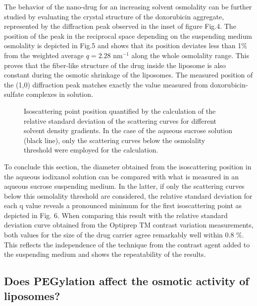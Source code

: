 The behavior of the nano-drug for an increasing solvent osmolality can be further studied by evaluating the crystal structure of the doxorubicin aggregate, represented by the diffraction peak observed in the inset of figure Fig.4. The position of the peak in the reciprocal space depending on the suspending medium osmolality is depicted in Fig.5 and shows that its position deviates less than 1$\%$ from the weighted average $q=2.28$ nm$^{-1}$ along the whole osmolality range. This proves that the fiber-like structure of the drug inside the liposome is also constant during the osmotic shrinkage of the liposomes. The measured position of the (1,0) diffraction peak matches exactly the value measured from doxorubicin-sulfate complexes in solution. \cite{lasic_gelation_1992}

\begin{figure}
	\centering
		
		\caption{Isoscattering point position quantified by the calculation of the relative standard deviation of the scattering curves for different solvent density gradients. In the case of the aqueous sucrose solution (black line), only the scattering curves below the osmolality threshold were employed for the calculation.}
		\label{fig:CaelyxIsopointComparison}
\end{figure}

To conclude this section, the diameter obtained from the isoscattering position in the aqueous iodixanol solution can be compared with what is measured in an aqueous sucrose suspending medium.  In the latter, if only the scattering curves below this osmolality threshold are considered, the relative standard deviation for each q value reveals a pronounced minimum for the first isoscattering point as depicted in Fig. 6. When comparing this result with the relative standard deviation curve obtained from the Optiprep TM contrast variation measurements, both values for the size of the drug carrier agree remarkably well within 0.8 $\%$. This reflects the independence of the technique from the contrast agent added to the suspending medium and shows the repeatability of the results.


\subsection{Does PEGylation affect the osmotic activity of liposomes?}

